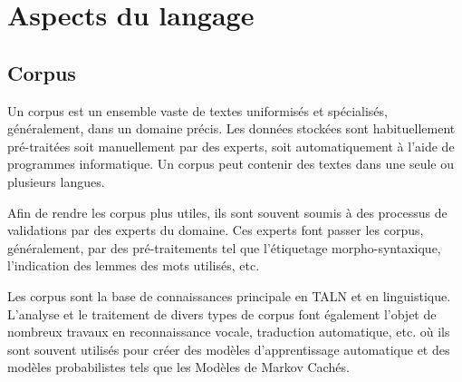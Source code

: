    
\section{Aspects du langage}
 
    \subsection{Corpus}
    Un corpus est un ensemble vaste de textes uniformisés et spécialisés, généralement, dans un domaine précis.
    Les données stockées sont habituellement pré-traitées soit manuellement par des experts, soit automatiquement à l'aide de programmes informatique. Un corpus peut contenir des textes dans une seule ou plusieurs langues.

    Afin de rendre les corpus plus utiles, ils sont souvent soumis à des processus de validations par des experts du domaine. Ces experts font passer les corpus, généralement, par des pré-traitements tel que l'étiquetage morpho-syntaxique, l'indication des lemmes des mots utilisés, etc.

    Les corpus sont la base de connaissances principale en TALN et en linguistique. L'analyse et le traitement de divers types de corpus font également l'objet de nombreux travaux en reconnaissance vocale, traduction automatique, etc. où ils sont souvent utilisés pour créer des modèles d'apprentissage automatique et des modèles probabilistes tels que les Modèles de Markov Cachés.


